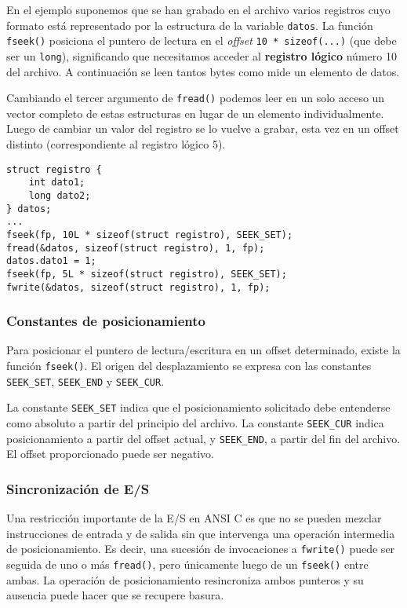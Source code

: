\begin{ejemplo}
En el ejemplo suponemos que se han grabado en el archivo varios registros cuyo
formato está representado por la estructura de la variable \lstinline{datos}. La función
\lstinline{fseek()} posiciona el puntero de lectura en el \textit{offset} \lstinline{10 * sizeof(...)} (que debe
ser un \lstinline{long}), significando que necesitamos acceder al \textbf{registro lógico} número 10 del
archivo. A continuación se leen tantos bytes como mide un elemento de datos.

Cambiando el tercer argumento de \lstinline{fread()} podemos leer en un solo acceso un
vector completo de estas estructuras en lugar de un elemento individualmente.
Luego de cambiar un valor del registro se lo vuelve a grabar, esta vez en un
offset distinto (correspondiente al registro lógico 5).
\begin{lstlisting}
struct registro {
    int dato1;
    long dato2;
} datos;
...
fseek(fp, 10L * sizeof(struct registro), SEEK_SET);
fread(&datos, sizeof(struct registro), 1, fp);
datos.dato1 = 1;
fseek(fp, 5L * sizeof(struct registro), SEEK_SET);
fwrite(&datos, sizeof(struct registro), 1, fp);
\end{lstlisting}
\end{ejemplo}

\subsubsection{Constantes de posicionamiento}
\label{subsubsec:posicionamiento}
Para posicionar el puntero de lectura/escritura en un offset determinado,
existe la función \lstinline{fseek()}. El origen del desplazamiento se expresa 
con las constantes \lstinline{SEEK_SET}, \lstinline{SEEK_END} y \lstinline{SEEK_CUR}.

La constante \lstinline{SEEK_SET} indica que el posicionamiento solicitado debe entenderse
como absoluto a partir del principio del archivo. La constante \lstinline{SEEK_CUR}
indica posicionamiento a partir del offset actual, y \lstinline{SEEK_END}, a partir del fin del
archivo. El offset proporcionado puede ser negativo.

\subsubsection{Sincronización de E/S}
Una restricción importante de la E/S en ANSI C es que no se pueden mezclar
instrucciones de entrada y de salida sin que intervenga una operación
intermedia de posicionamiento. Es decir, una sucesión de invocaciones a \lstinline{fwrite()} 
puede ser seguida de uno o más \lstinline{fread()}, pero únicamente luego de un \lstinline{fseek()}
entre ambas. La operación de posicionamiento resincroniza ambos punteros y su
ausencia puede hacer que se recupere basura.

